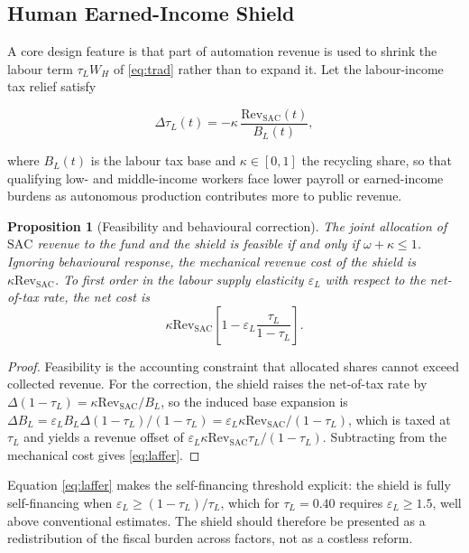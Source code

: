 \documentclass[journal]{IEEEtran}
\theoremstyle{plain}
\newtheorem{proposition}{Proposition}
\theoremstyle{definition}
\newcommand{\SAC}{\mathrm{SAC}}
\newcommand{\Rev}{\mathrm{Rev}}
\begin{document}
\subsection{Human Earned-Income Shield}

A core design feature is that part of automation revenue is used to shrink the labour term $\tau_L W_H$ of \eqref{eq:trad} rather than to expand it. Let the labour-income tax relief satisfy

\begin{equation}
\label{eq:shield}
\Delta\tau_L(t) = -\kappa\,\frac{\Rev_{\SAC}(t)}{B_L(t)},
\end{equation}

where $B_L(t)$ is the labour tax base and $\kappa\in[0,1]$ the recycling share, so that qualifying low- and middle-income workers face lower payroll or earned-income burdens as autonomous production contributes more to public revenue.

\begin{proposition}[Feasibility and behavioural correction]
\label{prop:shield}
The joint allocation of $\SAC$ revenue to the fund and the shield is feasible if and only if $\omega + \kappa \le 1$. Ignoring behavioural response, the mechanical revenue cost of the shield is $\kappa\Rev_{\SAC}$. To first order in the labour supply elasticity $\varepsilon_L$ with respect to the net-of-tax rate, the net cost is
\begin{equation}
\label{eq:laffer}
\kappa\Rev_{\SAC}\left[1 - \varepsilon_L\frac{\tau_L}{1-\tau_L}\right].
\end{equation}
\end{proposition}

\begin{proof}
Feasibility is the accounting constraint that allocated shares cannot exceed collected revenue. For the correction, the shield raises the net-of-tax rate by $\Delta(1-\tau_L) = \kappa\Rev_{\SAC}/B_L$, so the induced base expansion is $\Delta B_L = \varepsilon_L B_L \Delta(1-\tau_L)/(1-\tau_L) = \varepsilon_L\kappa\Rev_{\SAC}/(1-\tau_L)$, which is taxed at $\tau_L$ and yields a revenue offset of $\varepsilon_L\kappa\Rev_{\SAC}\tau_L/(1-\tau_L)$. Subtracting from the mechanical cost gives \eqref{eq:laffer}.
\end{proof}

Equation \eqref{eq:laffer} makes the self-financing threshold explicit: the shield is fully self-financing when $\varepsilon_L \ge (1-\tau_L)/\tau_L$, which for $\tau_L = 0.40$ requires $\varepsilon_L \ge 1.5$, well above conventional estimates. The shield should therefore be presented as a redistribution of the fiscal burden across factors, not as a costless reform.
\end{document}
